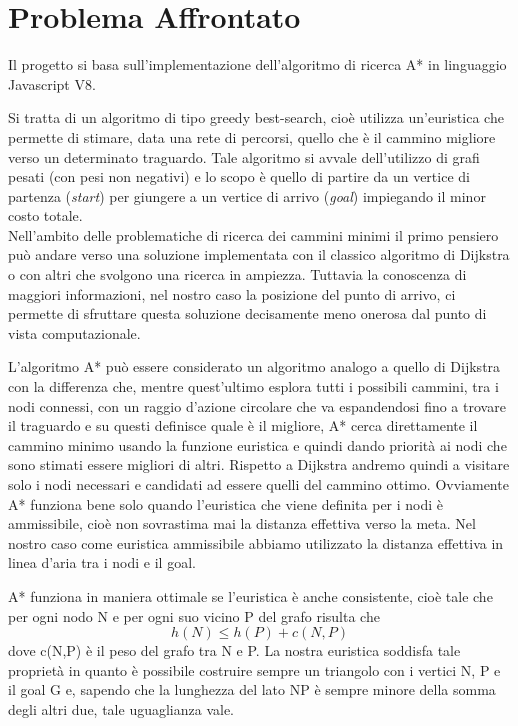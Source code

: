 \documentclass[12pt,a4paper]{report}
\begin{document}
\tableofcontents
\chapter{Problema Affrontato}
Il progetto si basa sull'implementazione dell'algoritmo di ricerca A* in linguaggio Javascript V8.

Si tratta di un algoritmo di tipo greedy best-search, cioè utilizza un'euristica che permette di stimare, data una rete di percorsi, quello che è il cammino migliore verso un determinato traguardo.
Tale algoritmo si avvale dell'utilizzo di grafi pesati (con pesi non negativi) e lo scopo è quello di partire da un vertice di partenza (\emph{start}) per giungere a un vertice di arrivo (\emph{goal}) impiegando il minor costo totale. 
\\

Nell'ambito delle problematiche di ricerca dei cammini minimi il primo pensiero può andare verso una soluzione implementata con il classico algoritmo di Dijkstra o con altri che svolgono una ricerca in ampiezza. Tuttavia la conoscenza di maggiori informazioni, nel nostro caso la posizione del punto di arrivo, ci permette di sfruttare questa soluzione decisamente meno onerosa dal punto di vista computazionale.

L'algoritmo A* può essere considerato un algoritmo analogo a quello di Dijkstra con la differenza che, mentre quest'ultimo esplora tutti i possibili cammini, tra i nodi connessi, con un raggio d'azione circolare che va espandendosi fino a trovare il traguardo e su questi definisce quale è il migliore, A* cerca direttamente il cammino minimo usando la funzione euristica e quindi dando priorità ai nodi che sono stimati essere migliori di altri. Rispetto a Dijkstra andremo quindi a visitare solo i nodi necessari e candidati ad essere quelli del cammino ottimo. Ovviamente A* funziona bene solo quando l'euristica che viene definita per i nodi è ammissibile, cioè non sovrastima mai la distanza effettiva verso la meta. Nel nostro caso come euristica ammissibile abbiamo utilizzato la distanza effettiva in linea d'aria tra i nodi e il goal.


\newpage
A* funziona in maniera ottimale se l'euristica è anche consistente, cioè tale che per ogni nodo N e per ogni suo vicino P del grafo risulta che \[h(N) \leq h(P) + c(N,P)\]dove c(N,P) è il peso del grafo tra N e P. La nostra euristica soddisfa tale proprietà in quanto è possibile costruire sempre un triangolo con i vertici N, P e il goal G e, sapendo che la lunghezza del lato NP è sempre minore della somma degli altri due, tale uguaglianza vale.
\end{document}

